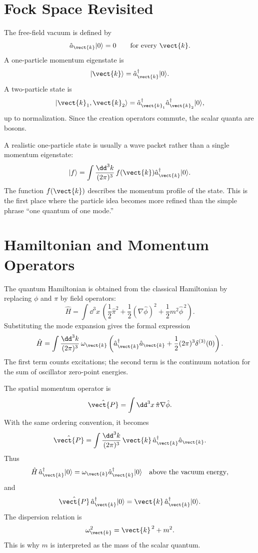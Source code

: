 \section{Fock Space Revisited}

The free-field vacuum is defined by
\[
    \hat a_{\vect{k}}|0\rangle=0
    \qquad \text{for every }\vect{k}.
\]
A one-particle momentum eigenstate is
\[
    |\vect{k}\rangle
    = \hat a_{\vect{k}}^\dagger|0\rangle.
\]
A two-particle state is
\[
    |\vect{k}_1,\vect{k}_2\rangle
    = \hat a_{\vect{k}_1}^\dagger
      \hat a_{\vect{k}_2}^\dagger|0\rangle,
\]
up to normalization. Since the creation operators commute, the scalar quanta are
bosons.

A realistic one-particle state is usually a wave packet rather than a single
momentum eigenstate:
\[
    |f\rangle
    = \int\frac{\dd^3k}{(2\pi)^3}\,f(\vect{k})
      \hat a_{\vect{k}}^\dagger|0\rangle.
\]
The function \(f(\vect{k})\) describes the momentum profile of the state. This
is the first place where the particle idea becomes more refined than the simple
phrase ``one quantum of one mode.''

\section{Hamiltonian and Momentum Operators}

The quantum Hamiltonian is obtained from the classical Hamiltonian by replacing
\(\phi\) and \(\pi\) by field operators:
\[
    \hat H
    = \int \dd^3x\,
    \left(
        \frac{1}{2}\hat\pi^2
        + \frac{1}{2}(\nabla\hat\phi)^2
        + \frac{1}{2}m^2\hat\phi^{\,2}
    \right).
\]
Substituting the mode expansion gives the formal expression
\[
    \hat H
    = \int \frac{\dd^3k}{(2\pi)^3}\,
      \omega_{\vect{k}}
      \left(
          \hat a_{\vect{k}}^\dagger\hat a_{\vect{k}}
          + \frac{1}{2}(2\pi)^3\delta^{(3)}(0)
      \right).
\]
The first term counts excitations; the second term is the continuum notation for
the sum of oscillator zero-point energies.

The spatial momentum operator is
\[
    \hat{\vect{P}}
    = \int \dd^3x\,\hat\pi\nabla\hat\phi.
\]
With the same ordering convention, it becomes
\[
    \hat{\vect{P}}
    = \int \frac{\dd^3k}{(2\pi)^3}\,
      \vect{k}\,\hat a_{\vect{k}}^\dagger\hat a_{\vect{k}}.
\]
Thus
\[
    \hat H\,\hat a_{\vect{k}}^\dagger|0\rangle
    = \omega_{\vect{k}}\hat a_{\vect{k}}^\dagger|0\rangle
    \quad \text{above the vacuum energy},
\]
and
\[
    \hat{\vect{P}}\,\hat a_{\vect{k}}^\dagger|0\rangle
    = \vect{k}\,\hat a_{\vect{k}}^\dagger|0\rangle.
\]
The dispersion relation is
\[
    \omega_{\vect{k}}^2=\vect{k}^{\,2}+m^2.
\]
This is why \(m\) is interpreted as the mass of the scalar quantum.

